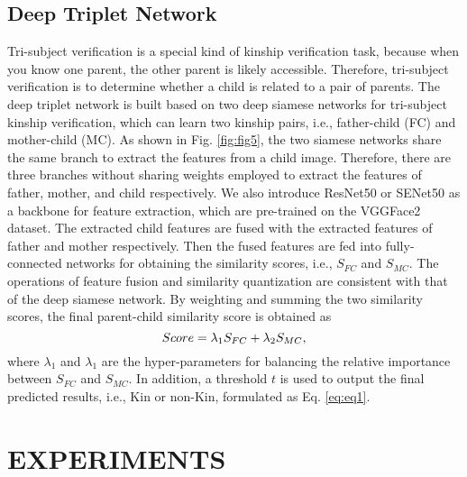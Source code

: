 \documentclass[a4paper, 10pt, conference]{ieeeconf}      %
\begin{document}
\subsection{Deep Triplet Network}

Tri-subject verification is a special kind of kinship verification task, because when you know one parent, the other parent is likely accessible. Therefore, tri-subject verification is to determine whether a child is related to a pair of parents. The deep triplet network is built based on two deep siamese networks for tri-subject kinship verification, which can learn two kinship pairs, i.e., father-child (FC) and mother-child (MC). As shown in Fig. \ref{fig:fig5}, the two siamese networks share the same branch to extract the features from a child image. Therefore, there are three branches without sharing weights employed to extract the features of father, mother, and child respectively. We also introduce ResNet50 or SENet50 as a backbone for feature extraction, which are pre-trained on the VGGFace2 dataset. The extracted child features are fused with the extracted features of father and mother respectively. Then the fused features are fed into fully-connected networks for obtaining the similarity scores, i.e., $S_{FC}$ and $S_{MC}$. The operations of feature fusion and similarity quantization are consistent with that of the deep siamese network. By weighting and summing the two similarity scores, the final parent-child similarity score is obtained as
\begin{equation}
\setlength{\abovedisplayskip}{0.2cm}
\setlength{\belowdisplayskip}{0.2cm}
Score = {\lambda}{_1}S_{FC} + {\lambda}{_2}S_{MC},
\end{equation}
where ${\lambda}{_1}$ and ${\lambda}{_1}$ are the hyper-parameters for balancing the relative importance between $S_{FC}$ and $S_{MC}$. In addition, a threshold $t$ is used to output the final predicted results, i.e., Kin or non-Kin, formulated as Eq. \ref{eq:eq1}.



\section{EXPERIMENTS}
\end{document}
